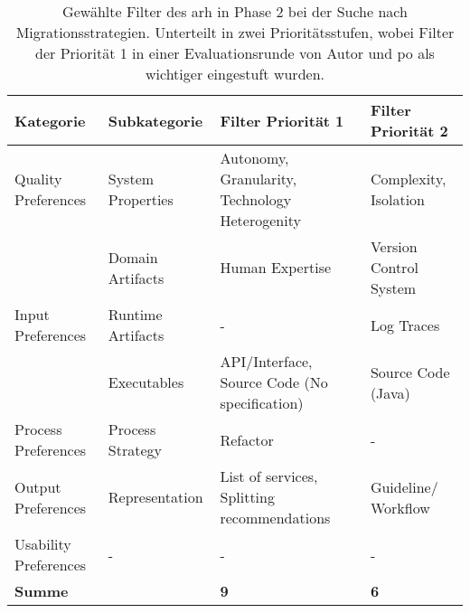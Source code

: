 \begin{table}[!h]
  \centering
  \begin{tabular}{m{3cm} l m{4cm} m{3.5cm}}
    \toprule
    \textbf{Kategorie} & \textbf{Subkategorie} & \textbf{Filter Priorität 1} & \textbf{Filter Priorität 2} \\ \midrule
    Quality Preferences & System Properties & Autonomy, Granularity, Tech\-nology Heterogenity & Complexity, Isolation \\ \hline
    & Domain Artifacts & Human Expertise & Version Control Sys\-tem \\
    Input Preferences & Runtime Artifacts & - & Log Traces \\
     & Executables & API/Interface, Source Code (No specifica\-tion) & Source Code (Java) \\ \hline
    Process Preferences & Process Strategy & Refactor & - \\ \hline
    Output Preferences & Representation & List of services, Split\-ting recommendations & Guideline/ Workflow \\ \hline
    Usability Preferences & - & - & - \\ \midrule
    \multicolumn{2}{l}{\textbf{Summe}} &\textbf{9} & \textbf{6} \\ \bottomrule
  \end{tabular}
  \caption[Gewählte Filter des \acrshort{arh}]{
    Gewählte Filter des \gls{arh} in Phase 2 bei der Suche nach Migrationsstrategien.
    Unterteilt in zwei Prioritätsstufen, wobei Filter der Priorität 1 in einer Evaluationsrunde von Autor und \gls{po} als wichtiger eingestuft wurden.
  }
  \label{tab:phase2-selected-filter}
\end{table}
